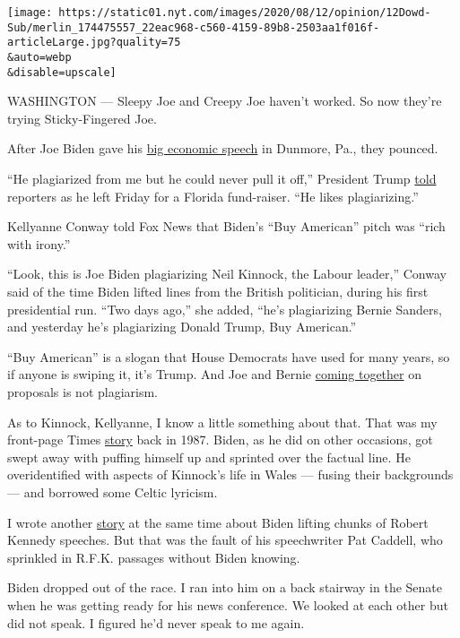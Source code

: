 \texttt{[image: https://static01.nyt.com/images/2020/08/12/opinion/12Dowd-Sub/merlin\_174475557\_22eac968-c560-4159-89b8-2503aa1f016f-articleLarge.jpg?quality=75\\\&auto=webp\\\&disable=upscale]}

WASHINGTON --- Sleepy Joe and Creepy Joe haven't worked. So now they're
trying Sticky-Fingered Joe.

After Joe Biden gave his
\href{https://www.nytimes.com/2020/07/09/us/politics/biden-buy-american.html}{big
economic speech} in Dunmore, Pa., they pounced.

``He plagiarized from me but he could never pull it off,'' President
Trump
\href{https://twitter.com/CBSNews/status/1281615665242214403?s=20}{told}
reporters as he left Friday for a Florida fund-raiser. ``He likes
plagiarizing.''

Kellyanne Conway told Fox News that Biden's ``Buy American'' pitch was
``rich with irony.''

``Look, this is Joe Biden plagiarizing Neil Kinnock, the Labour
leader,'' Conway said of the time Biden lifted lines from the British
politician, during his first presidential run. ``Two days ago,'' she
added, ``he's plagiarizing Bernie Sanders, and yesterday he's
plagiarizing Donald Trump, Buy American.''

``Buy American'' is a slogan that House Democrats have used for many
years, so if anyone is swiping it, it's Trump. And Joe and Bernie
\href{https://www.nytimes.com/2020/07/08/us/politics/biden-bernie-sanders.html}{coming
together} on proposals is not plagiarism.

As to Kinnock, Kellyanne, I know a little something about that. That was
my front-page Times
\href{https://www.nytimes.com/1987/09/12/us/biden-s-debate-finale-an-echo-from-abroad.html}{story}
back in 1987. Biden, as he did on other occasions, got swept away with
puffing himself up and sprinted over the factual line. He overidentified
with aspects of Kinnock's life in Wales --- fusing their backgrounds ---
and borrowed some Celtic lyricism.

I wrote another
\href{https://www.nytimes.com/1987/09/16/us/biden-is-facing-growing-debate-on-his-speeches.html}{story}
at the same time about Biden lifting chunks of Robert Kennedy speeches.
But that was the fault of his speechwriter Pat Caddell, who sprinkled in
R.F.K. passages without Biden knowing.

Biden dropped out of the race. I ran into him on a back stairway in the
Senate when he was getting ready for his news conference. We looked at
each other but did not speak. I figured he'd never speak to me again.

